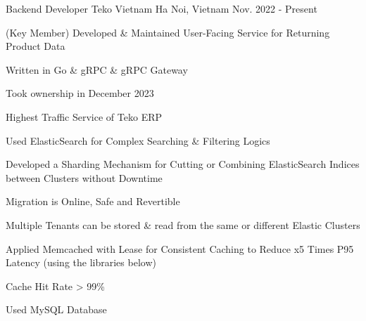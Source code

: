 


\begin{cventries}


\cventry
{Backend Developer} %
{Teko Vietnam} %
{Ha Noi, Vietnam} %
{Nov. 2022 - Present} %
{ %
\begin{cvitems}
\item{(Key Member) Developed \& Maintained User-Facing Service for Returning Product Data}
\item{Written in Go \& gRPC \& gRPC Gateway}
\item{Took ownership in December 2023}
\item{Highest Traffic Service of Teko ERP}
\item{Used ElasticSearch for Complex Searching \& Filtering Logics}
\item{Developed a Sharding Mechanism for Cutting or Combining ElasticSearch Indices between Clusters without Downtime} 
\item{Migration is Online, Safe and Revertible}
\item{Multiple Tenants can be stored \& read from the same or different Elastic Clusters} 
\item{Applied Memcached with Lease for Consistent Caching to Reduce x5 Times P95 Latency (using the libraries below)}
\item{Cache Hit Rate > 99\%}
\item{Used MySQL Database}
\end{cvitems}
}



\end{cventries}
